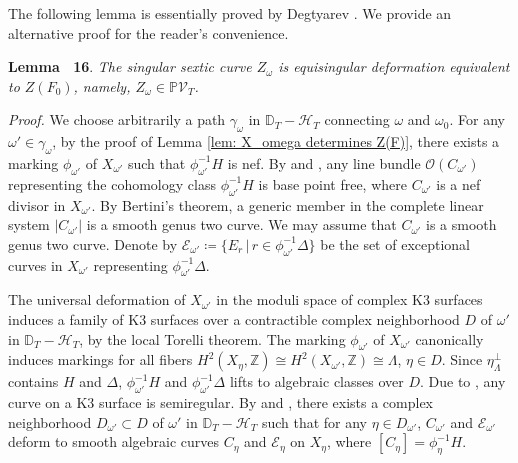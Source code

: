 \documentclass[
]{article}
\begin{document}
The following lemma is essentially proved by Degtyarev
\cite[Theorem 3.4.1]{degtyarev2008deformations}. We provide an
alternative proof for the reader's convenience.

\textbf{Lemma~ 16}. \emph{\label{lem: Z_omega has type T} The singular
sextic curve \(Z_\omega\) is equisingular deformation equivalent to
\(Z(F_0)\), namely, \(Z_\omega\in \mathbb{P}\mathcal{V}_T\).}

\emph{Proof.} We choose arbitrarily a path \(\gamma_\omega\) in
\(\mathbb{D}_T-\mathcal{H}_T\) connecting \(\omega\) and \(\omega_0\).
For any \(\omega'\in\gamma_\omega\), by the proof of Lemma
\ref{lem: X_omega determines Z(F)}, there exists a marking
\(\phi_{\omega'}\) of \(X_{\omega'}\) such that
\(\phi_{\omega'}^{-1} H\) is nef. By
\cite[Proposition 1.7]{urabe1988combinations} and
\cite[Chapter 2, \S 3, Corollary 3.14]{huybrechts2016lectures}, any line
bundle \(\mathcal{O}(C_{\omega'})\) representing the cohomology class
\(\phi_{\omega'}^{-1} H\) is base point free, where \(C_{\omega'}\) is a
nef divisor in \(X_{\omega'}\). By Bertini's theorem, a generic member
in the complete linear system \(|C_{\omega'}|\) is a smooth genus two
curve. We may assume that \(C_{\omega'}\) is a smooth genus two curve.
Denote by
\(\mathcal{E}_{\omega'}\coloneqq\{E_r \,|\, r\in \phi_{\omega'}^{-1} \Delta\}\)
be the set of exceptional curves in \(X_{\omega'}\) representing
\(\phi_{\omega'}^{-1} \Delta\).

The universal deformation of \(X_{\omega'}\) in the moduli space of
complex K3 surfaces induces a family of K3 surfaces over a contractible
complex neighborhood \(D\) of \(\omega'\) in
\(\mathbb{D}_T-\mathcal{H}_T\), by the local Torelli theorem. The
marking \(\phi_{\omega'}\) of \(X_{\omega'}\) canonically induces
markings for all fibers
\(H^2(X_\eta,\mathbb{Z})\cong H^2(X_{\omega'},\mathbb{Z})\cong\Lambda\),
\(\eta\in D\). Since \(\eta^\perp_\Lambda\) contains \(H\) and
\(\Delta\), \(\phi_{\omega'}^{-1} H\) and \(\phi_{\omega'}^{-1} \Delta\)
lifts to algebraic classes over \(D\). Due to
\cite[Page 363]{nishinou2024deformation}, any curve on a K3 surface is
semiregular. By \cite[Theorem 7.1]{bloch1972semi-regularity} and
\cite[Theorem 1.5(i)]{artin1968solutions}, there exists a complex
neighborhood \(D_{\omega'}\subset D\) of \(\omega'\) in
\(\mathbb{D}_T-\mathcal{H}_T\) such that for any
\(\eta\in D_{\omega'}\), \(C_{\omega'}\) and \(\mathcal{E}_{\omega'}\)
deform to smooth algebraic curves \(C_{\eta}\) and
\(\mathcal{E}_{\eta}\) on \(X_\eta\), where
\([C_{\eta}]=\phi_\eta^{-1} H\).
\end{document}
